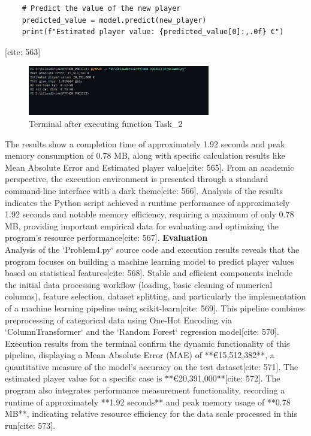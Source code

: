 \documentclass[12pt]{report}
\begin{document}
{{{\begin{lstlisting}
    # Predict the value of the new player
    predicted_value = model.predict(new_player)
    print(f"Estimated player value: {predicted_value[0]:,.0f} €")
\end{lstlisting} [cite: 563]
\begin{figure}[h]
    \centering
    \includegraphics[width=300px]{Terminal_41.png}
    \caption{Terminal after executing function Task\_2}
    \label{fig:res4}
\end{figure}
The results show a completion time of approximately 1.92 seconds and peak memory consumption of 0.78 MB, along with specific calculation results like Mean Absolute Error and Estimated player value[cite: 565]. From an academic perspective, the execution environment is presented through a standard command-line interface with a dark theme[cite: 566]. Analysis of the results indicates the Python script achieved a runtime performance of approximately 1.92 seconds and notable memory efficiency, requiring a maximum of only 0.78 MB, providing important empirical data for evaluating and optimizing the program's resource performance[cite: 567].
\textbf{Evaluation}\\
Analysis of the `Problem4.py` source code and execution results reveals that the program focuses on building a machine learning model to predict player values based on statistical features[cite: 568]. Stable and efficient components include the initial data processing workflow (loading, basic cleaning of numerical columns), feature selection, dataset splitting, and particularly the implementation of a machine learning pipeline using scikit-learn[cite: 569]. This pipeline combines preprocessing of categorical data using One-Hot Encoding via `ColumnTransformer` and the `Random Forest` regression model[cite: 570]. Execution results from the terminal confirm the dynamic functionality of this pipeline, displaying a Mean Absolute Error (MAE) of **€15,512,382**, a quantitative measure of the model's accuracy on the test dataset[cite: 571]. The estimated player value for a specific case is **€20,391,000**[cite: 572]. The program also integrates performance measurement functionality, recording a runtime of approximately **1.92 seconds** and peak memory usage of **0.78 MB**, indicating relative resource efficiency for the data scale processed in this run[cite: 573].
}}}
\end{document}

